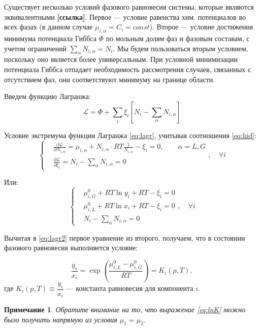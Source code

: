 \documentclass[12pt]{article}
\newcommand{\pd}[2]{\frac{\partial #1}{\partial #2}}
\newtheorem{note}{Примечание}[section]
\begin{document}
Существует несколько условий фазового равновесия системы, которые являются эквивалентными \textbf{[ссылка]}. Первое --- условие равенства хим. потенциалов во всех фазах (в данном случае $\mu_{i, \alpha} = C_i = const$). Второе --- условие достижения минимума потенциала Гиббса $\Phi$ по мольным долям фаз и фазовым составам, с учетом ограничений $\sum_\alpha N_{i, \alpha} = N_i$. Мы будем пользоваться вторым условием, поскольку оно является более универсальным. При условной минимизации потенциала Гиббса отпадает необходимость рассмотрения случаев, связанных с отсутствием фаз, они соответствуют минимуму на границе области.

Введем функцию Лагранжа:
\begin{equation}
\mathscr{L} = \Phi + \sum_i{\xi_i \left[N_i - \sum_\alpha N_{i, \alpha} \right]}
\label{eq:lagr}
\end{equation} 


Условие экстремума функции Лагранжа \eqref{eq:lagr}, учитывая соотношения \eqref{eq:hid}:
\[
\left\{
\begin{aligned}
& \pd{\mathscr{L}}{N_{i, \alpha}} = \mu_{i, \alpha} + N_{i, \alpha} \cdot RT \frac{1}{N_{i, \alpha}} - \xi_i = 0, \qquad \alpha=L, G \\
& \pd{\mathscr{L}}{\xi_i} = N_i - \sum_{\alpha} N_{i,\alpha} = 0 
\end{aligned}
\right.,\quad\forall i
\]

Или:
\begin{equation}
\left\{
\begin{aligned}
& \mu_{i, G}^0 + RT \ln y_i + RT - \xi_i = 0\\
& \mu_{i, L}^0 + RT \ln x_i + RT - \xi_i = 0\\
& N_i - \sum_{\alpha} N_{i,\alpha} = 0
\end{aligned}
\label{eq:lagr2}
\right.,\quad\forall i
\end{equation}

Вычитая в \eqref{eq:lagr2} первое уравнение из второго, получаем, что в состоянии фазового равновесия выполняется условие:

\begin{equation}
\frac{y_i}{x_i} = \exp \left(\frac{\mu_{i, L}^0 - \mu_{i, G}^0}{RT}\right) = K_i(p,T),
\label{eq:lnK}
\end{equation}
где $K_i(p,T) \equiv \dfrac{y_i}{x_i}$ --- константа равновесия для компонента $i$.


\begin{note}
Обратите внимание на то, что выражение \eqref{eq:lnK} можно было получить напрямую из условия $\mu_1 = \mu_2$.
\end{note}
\end{document}
